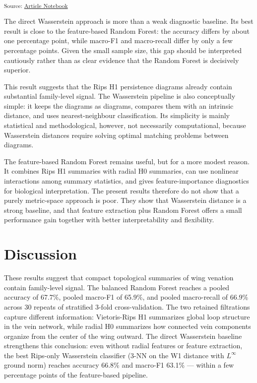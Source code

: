 \documentclass[
  a4paper,
  DIV=11,
  numbers=noendperiod]{scrartcl}
\begin{document}
\textsubscript{Source:
\href{https://JuliaTDA.github.io/tda-fly/index.qmd.html}{Article
Notebook}}

The direct Wasserstein approach is more than a weak diagnostic baseline.
Its best result is close to the feature-based Random Forest: the
accuracy differs by about one percentage point, while macro-F1 and
macro-recall differ by only a few percentage points. Given the small
sample size, this gap should be interpreted cautiously rather than as
clear evidence that the Random Forest is decisively superior.

This result suggests that the Rips H1 persistence diagrams already
contain substantial family-level signal. The Wasserstein pipeline is
also conceptually simple: it keeps the diagrams as diagrams, compares
them with an intrinsic distance, and uses nearest-neighbour
classification. Its simplicity is mainly statistical and methodological,
however, not necessarily computational, because Wasserstein distances
require solving optimal matching problems between diagrams.

The feature-based Random Forest remains useful, but for a more modest
reason. It combines Rips H1 summaries with radial H0 summaries, can use
nonlinear interactions among summary statistics, and gives
feature-importance diagnostics for biological interpretation. The
present results therefore do not show that a purely metric-space
approach is poor. They show that Wasserstein distance is a strong
baseline, and that feature extraction plus Random Forest offers a small
performance gain together with better interpretability and flexibility.

\section{Discussion}\label{discussion}

These results suggest that compact topological summaries of wing
venation contain family-level signal. The balanced Random Forest reaches
a pooled accuracy of 67.7\%, pooled macro-F1 of 65.9\%, and pooled
macro-recall of 66.9\% across 30 repeats of stratified 3-fold
cross-validation. The two retained filtrations capture different
information: Vietoris-Rips H1 summarizes global loop structure in the
vein network, while radial H0 summarizes how connected vein components
organize from the center of the wing outward. The direct Wasserstein
baseline strengthens this conclusion: even without radial features or
feature extraction, the best Rips-only Wasserstein classifier (3-NN on
the W1 distance with \(L^\infty\) ground norm) reaches accuracy 66.8\%
and macro-F1 63.1\% --- within a few percentage points of the
feature-based pipeline.
\end{document}

